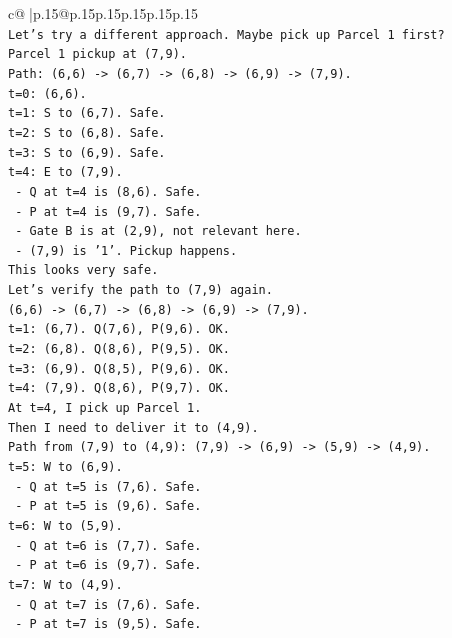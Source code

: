 \documentclass{article}
\begin{document}
{\begin{supertabular}{c@{$\;$}|p{.15\linewidth}@{}p{.15\linewidth}p{.15\linewidth}p{.15\linewidth}p{.15\linewidth}p{.15\linewidth}}
{{{\\ 
\texttt{Let's try a different approach. Maybe pick up Parcel 1 first?} \\
\texttt{Parcel 1 pickup at (7,9).} \\
\texttt{Path: (6,6) {-}> (6,7) {-}> (6,8) {-}> (6,9) {-}> (7,9).} \\
\texttt{t=0: (6,6).} \\
\texttt{t=1: S to (6,7). Safe.} \\
\texttt{t=2: S to (6,8). Safe.} \\
\texttt{t=3: S to (6,9). Safe.} \\
\texttt{t=4: E to (7,9).} \\
\texttt{  {-} Q at t=4 is (8,6). Safe.} \\
\texttt{  {-} P at t=4 is (9,7). Safe.} \\
\texttt{  {-} Gate B is at (2,9), not relevant here.} \\
\texttt{  {-} (7,9) is '1'. Pickup happens.} \\
\texttt{This looks very safe.} \\
\texttt{Let's verify the path to (7,9) again.} \\
\texttt{(6,6) {-}> (6,7) {-}> (6,8) {-}> (6,9) {-}> (7,9).} \\
\texttt{t=1: (6,7). Q(7,6), P(9,6). OK.} \\
\texttt{t=2: (6,8). Q(8,6), P(9,5). OK.} \\
\texttt{t=3: (6,9). Q(8,5), P(9,6). OK.} \\
\texttt{t=4: (7,9). Q(8,6), P(9,7). OK.} \\
\texttt{At t=4, I pick up Parcel 1.} \\
\texttt{Then I need to deliver it to (4,9).} \\
\texttt{Path from (7,9) to (4,9): (7,9) {-}> (6,9) {-}> (5,9) {-}> (4,9).} \\
\texttt{t=5: W to (6,9).} \\
\texttt{  {-} Q at t=5 is (7,6). Safe.} \\
\texttt{  {-} P at t=5 is (9,6). Safe.} \\
\texttt{t=6: W to (5,9).} \\
\texttt{  {-} Q at t=6 is (7,7). Safe.} \\
\texttt{  {-} P at t=6 is (9,7). Safe.} \\
\texttt{t=7: W to (4,9).} \\
\texttt{  {-} Q at t=7 is (7,6). Safe.} \\
\texttt{  {-} P at t=7 is (9,5). Safe.} \\
}}}
\end{supertabular}}
\end{document}
